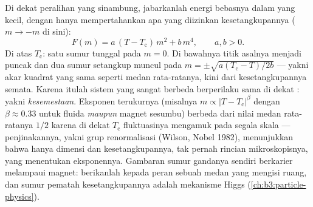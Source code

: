 \begin{proposition}\label{prop:b3:phase-transitions:landau}
Di dekat peralihan yang sinambung, jabarkanlah energi bebasnya dalam
 yang kecil, dengan hanya mempertahankan apa yang
diizinkan kesetangkupannya ($m \to -m$ di sini):
\[
F(m) = a\,(T - T_{\text{c}})\,m^2 + b\,m^4 , \qquad a, b > 0 .
\]
Di atas $T_{\text{c}}$: satu sumur tunggal pada $m = 0$. Di bawahnya
titik asalnya menjadi puncak dan dua sumur setangkup muncul pada $m = \pm
\sqrt{a(T_{\text{c}} - T)/2b}$ --- yakni akar kuadrat yang sama seperti
medan rata-ratanya, kini dari kesetangkupannya semata. Karena itulah
sistem yang sangat berbeda berperilaku sama di dekat :
yakni \emph{kesemestaan}. Eksponen terukurnya (misalnya $m \propto |T -
T_{\text{c}}|^\beta$ dengan $\beta \approx 0.33$ untuk fluida
\emph{maupun} magnet sesumbu) berbeda dari nilai medan rata-ratanya $1/2$
karena di dekat $T_{\text{c}}$ fluktuasinya mengamuk pada segala skala ---
penjinakannya, yakni grup renormalisasi (Wilson, Nobel 1982),
menunjukkan bahwa hanya dimensi dan kesetangkupannya, tak pernah rincian
mikroskopisnya, yang menentukan eksponennya. Gambaran sumur gandanya
sendiri berkarier melampaui magnet: berikanlah kepada  peran sebuah medan yang mengisi ruang, dan sumur pematah
kesetangkupannya adalah mekanisme Higgs
(\cref{ch:b3:particle-physics}).
\end{proposition}
\admitted

